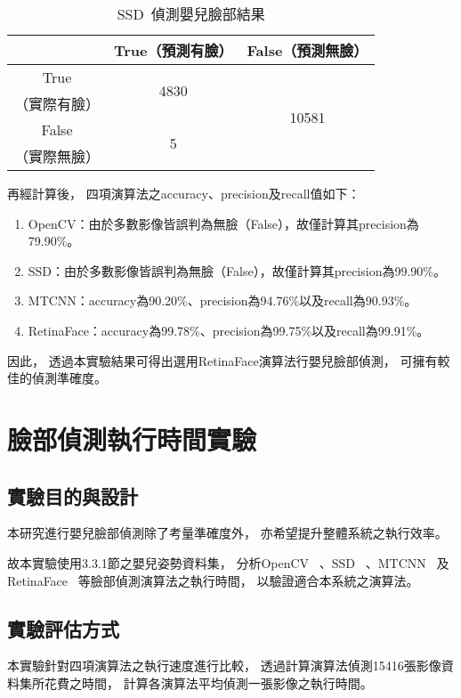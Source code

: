 \documentclass[class=NCU_thesis, crop=false]{standalone}
\begin{document}
\begin{table}[h]
    \centering
    \caption{SSD~\cite{ye_face_2021}偵測嬰兒臉部結果}
    \label{table:table-ssd}
    \begin{tabular}{ccc}
    \hline
     & True（預測有臉）& False（預測無臉）\\
    \hline
    True & \multirow{2}{*}{4830} & \multirow{4}{*}{10581} \\
    （實際有臉）& & \\
    False & \multirow{2}{*}{5} & \\
    （實際無臉）&  & \\
    \hline
    \end{tabular}
\end{table}

再經計算後，
四項演算法之accuracy、precision及recall值如下：
\begin{enumerate}
    \item OpenCV：由於多數影像皆誤判為無臉（False），故僅計算其precision為79.90\%。
    \item SSD：由於多數影像皆誤判為無臉（False），故僅計算其precision為99.90\%。
    \item MTCNN：accuracy為90.20\%、precision為94.76\%以及recall為90.93\%。
    \item RetinaFace：accuracy為99.78\%、precision為99.75\%以及recall為99.91\%。
\end{enumerate}

因此，
透過本實驗結果可得出選用RetinaFace演算法行嬰兒臉部偵測，
可擁有較佳的偵測準確度。

\section{臉部偵測執行時間實驗}
\subsection{實驗目的與設計}
本研究進行嬰兒臉部偵測除了考量準確度外，
亦希望提升整體系統之執行效率。

故本實驗使用3.3.1節之嬰兒姿勢資料集，
分析OpenCV~\cite{goyal_face_2017}
、SSD~\cite{ye_face_2021}
、MTCNN~\cite{zhang_joint_2016}
及RetinaFace~\cite{deng_retinaface_2020}
等臉部偵測演算法之執行時間，
以驗證適合本系統之演算法。

\subsection{實驗評估方式}
本實驗針對四項演算法之執行速度進行比較，
透過計算演算法偵測15416張影像資料集所花費之時間，
計算各演算法平均偵測一張影像之執行時間。
\end{document}
